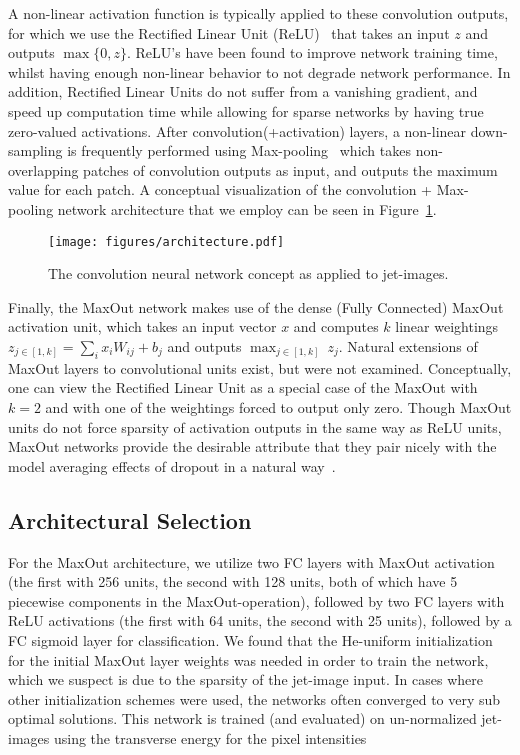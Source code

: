 A non-linear activation function is typically applied to these convolution outputs, for which we use the Rectified Linear Unit (ReLU)~\cite{RELU} that takes an input $z$ and outputs $\max\{0,z\}$. ReLU's have been found to improve network training time, whilst having enough non-linear behavior to not degrade network performance. In addition, Rectified Linear Units do not suffer from a vanishing gradient, and speed up computation time while allowing for sparse networks by having true zero-valued activations.  After convolution(+activation) layers, a non-linear down-sampling is frequently performed using Max-pooling~\cite{MAXPOOL} which takes non-overlapping patches of convolution outputs as input, and outputs the maximum value for each patch.  A conceptual visualization of the convolution + Max-pooling network architecture that we employ can be seen in Figure~\ref{fig:arch}.
\begin{figure}[!htbp]
  \centering
  \texttt{[image: figures/architecture.pdf]}
  \caption{The convolution neural network concept as applied to jet-images.}
  \label{fig:arch}
\end{figure}

Finally, the MaxOut network makes use of the dense (Fully Connected) MaxOut activation unit, which takes an input vector $x$ and computes $k$ linear weightings $z_{j\in [1,k]} = \sum_{i} x_{i} W_{ij} + b_{j}$ and  outputs $\max_{j\in [1,k]}\ z_{j}$. Natural extensions of MaxOut layers to convolutional units exist, but were not examined. Conceptually, one can view the Rectified Linear Unit as a special case of the MaxOut with $k=2$ and with one of the weightings forced to output only zero. Though MaxOut units do not force sparsity of activation outputs in the same way as ReLU units, MaxOut networks provide the desirable attribute that they pair nicely with the model averaging effects of dropout in a natural way~\cite{maxout:goodfellow}. 




\subsection{Architectural Selection} %
\label{ssub:architectural_selection}
For the MaxOut architecture, we utilize two FC layers with MaxOut activation (the first with 256 units, the second with 128 units, both of which have 5 piecewise components in the MaxOut-operation), followed by two FC layers with ReLU activations (the first with 64 units, the second with 25 units), followed by a FC sigmoid layer for classification. We found that the He-uniform initialization~\cite{HE_initialization} for the initial MaxOut layer weights was needed in order to train the network, which we suspect is due to the sparsity of the jet-image input. In cases where other initialization schemes were used, the networks often converged to very sub optimal solutions.  This network is trained (and evaluated) on un-normalized jet-images using the transverse energy for the pixel intensities

